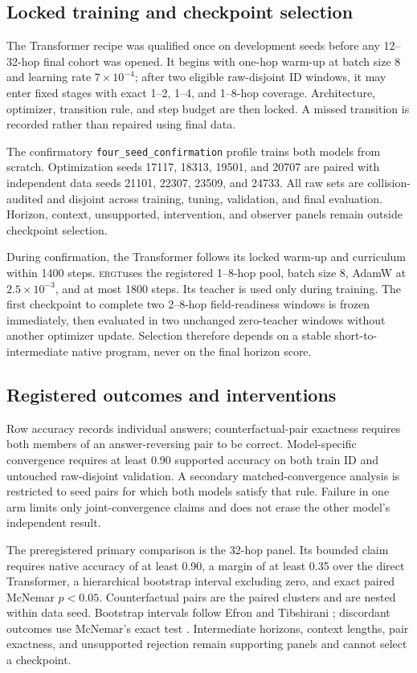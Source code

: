 \documentclass[11pt]{article}
\newcommand{\ERGT}{\textsc{ergt}}
\begin{document}
\subsection{Locked training and checkpoint selection}

The Transformer recipe was qualified once on development seeds before any
12--32-hop final cohort was opened. It begins with one-hop warm-up at batch
size 8 and learning rate $7\times10^{-4}$; after two eligible raw-disjoint ID
windows, it may enter fixed stages with exact 1--2, 1--4, and 1--8-hop
coverage. Architecture, optimizer, transition rule, and step budget are then
locked. A missed transition is recorded rather than repaired using final data.

The confirmatory \texttt{four\_seed\_confirmation} profile trains both models
from scratch. Optimization seeds 17117, 18313, 19501, and 20707 are paired
with independent data seeds 21101, 22307, 23509, and 24733. All raw sets are
collision-audited and disjoint across training, tuning, validation, and final
evaluation. Horizon, context, unsupported, intervention, and observer panels
remain outside checkpoint selection.

During confirmation, the Transformer follows its locked warm-up and curriculum
within 1400 steps. \ERGT uses the registered 1--8-hop pool, batch size 8,
AdamW at $2.5\times10^{-3}$, and at most 1800 steps. Its teacher is used only
during training. The first checkpoint to complete two 2--8-hop field-readiness
windows is frozen immediately, then evaluated in two unchanged zero-teacher
windows without another optimizer update. Selection therefore depends on a
stable short-to-intermediate native program, never on the final horizon score.

\subsection{Registered outcomes and interventions}

Row accuracy records individual answers; counterfactual-pair exactness requires
both members of an answer-reversing pair to be correct. Model-specific
convergence requires at least 0.90 supported accuracy on both train ID and
untouched raw-disjoint validation. A secondary matched-convergence analysis is
restricted to seed pairs for which both models satisfy that rule. Failure in one
arm limits only joint-convergence claims and does not erase the other model's
independent result.

The preregistered primary comparison is the 32-hop panel. Its bounded claim
requires native accuracy of at least 0.90, a margin of at least 0.35 over the
direct Transformer, a hierarchical bootstrap interval excluding zero, and
exact paired McNemar $p<0.05$. Counterfactual pairs are the paired clusters and
are nested within data seed. Bootstrap intervals follow Efron and Tibshirani
\cite{efron1993bootstrap}; discordant outcomes use McNemar's exact test
\cite{mcnemar1947note}. Intermediate horizons, context lengths, pair exactness,
and unsupported rejection remain supporting panels and cannot select a
checkpoint.
\end{document}
